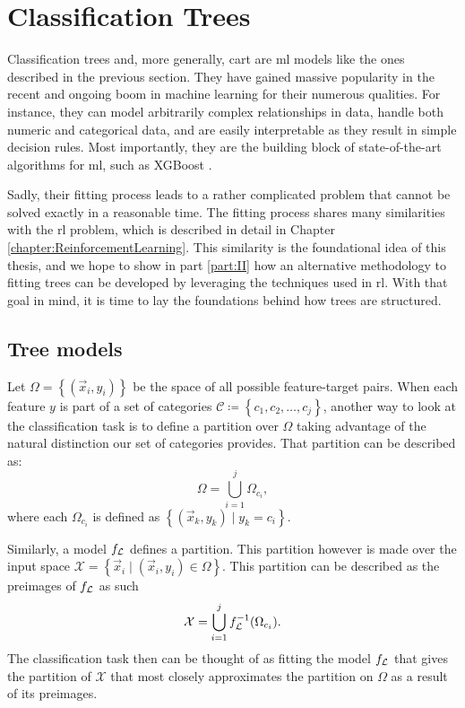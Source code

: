 \section{Classification Trees}

Classification trees and, more generally, \acf{cart} are \ac{ml} models like the
ones described in the previous section.  They have gained massive popularity in
the recent and ongoing boom in machine learning for their numerous qualities.
For instance, they can model arbitrarily complex relationships in data, handle
both numeric and categorical data, and are easily interpretable as they result
in simple decision rules. Most importantly, they are the building block of
state-of-the-art algorithms for \ac{ml}, such as XGBoost \cite{XGBoost}.

Sadly, their fitting process leads to a rather complicated problem that cannot
be solved exactly in a reasonable time. The fitting process shares many
similarities with the \ac{rl} problem, which is described in detail in Chapter
\ref{chapter:ReinforcementLearning}. This similarity is the foundational idea of
this thesis, and we hope to show in part \ref{part:II} how an alternative
methodology to fitting trees can be developed by leveraging the techniques used
in \ac{rl}. With that goal in mind, it is time to lay the foundations behind how
trees are structured.

\subsection{Tree models}

Let $\Omega = \left\{ (\vec{x}_i, y_i) \right\}$ be the space of all possible
feature-target pairs. When each feature $y$ is part of a set of categories
$\mathcal{C} \coloneqq \left\{ c_1, c_2, \dots, c_j \right\}$, another way to
look at the classification task is to define a partition over $\Omega$ taking
advantage of the natural distinction our set of categories provides. That
partition can be described as:
\[
    \Omega = \bigcup_{i=1}^{j} \Omega_{c_i},
\]
where each $\Omega_{c_i}$ is defined as $\left\{ (\vec{x}_k, y_k) \mid y_k = c_i
\right\}$.

Similarly, a model $f_{\mathcal{L}}$ defines a partition. This partition however is made
over the input space $\mathcal{X} = \left\{ \vec{x}_i \mid (\vec{x}_i, y_i) \in
\Omega \right\}$. This partition can be described as the preimages of $f_{\mathcal{L}}$ as
such
\[
    \mathcal{X} = \bigcup_{i=1}^{j} f_{\mathcal{L}}^{-1}(\Omega_{c_i}).
\]
The classification task then can be thought of as fitting the model $f_{\mathcal{L}}$ that
gives the partition of $\mathcal{X}$ that most closely approximates the
partition on $\Omega$ as a result of its preimages.

